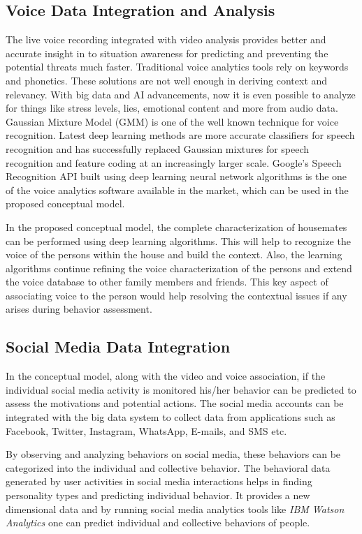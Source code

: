 \documentclass[sigconf]{acmart}
\begin{document}
\subsection{Voice Data Integration and Analysis}
The live voice recording integrated with video analysis provides better and accurate insight in to situation awareness for predicting and preventing the potential threats much faster. Traditional voice analytics tools rely on keywords and phonetics. These solutions are not well enough in deriving context and relevancy. With big data and AI advancements, now it is even possible to analyze for things like stress levels, lies, emotional content and more from audio data. Gaussian Mixture Model (GMM) is one of the well known technique for voice recognition. Latest deep learning methods are more accurate classifiers for speech recognition and has successfully replaced Gaussian mixtures for speech recognition and feature coding at an increasingly larger scale. Google's Speech Recognition API built using deep learning neural network algorithms is the one of the voice analytics software available in the market, which can be used in the proposed conceptual model.

In the proposed conceptual model, the complete characterization of housemates can be performed using deep learning algorithms. This will help to recognize the voice of the persons within the house and build the context. Also, the learning algorithms continue refining the voice characterization of the persons and extend the voice database to other family members and friends. This key aspect of associating voice to the person would help resolving the contextual issues if any arises during behavior assessment.

\subsection{Social Media Data Integration}
In the conceptual model, along with the video and voice association, if the individual social media activity is monitored his/her behavior can be predicted to assess the motivations and potential actions. The social media accounts can be integrated with the big data system to collect data from applications such as Facebook, Twitter, Instagram, WhatsApp, E-mails, and SMS etc.

By observing and analyzing behaviors on social media, these behaviors can be categorized into the individual and collective behavior. The behavioral data generated by user activities in social media interactions  helps in finding personality types and predicting individual behavior. It provides a new dimensional data 
and by running social media analytics tools like \textit{IBM Watson Analytics} one can predict individual and collective behaviors of people.
\end{document}
